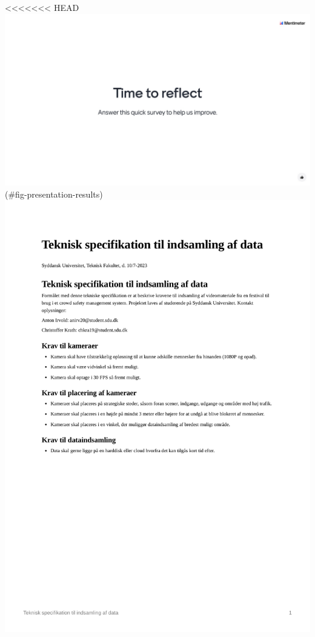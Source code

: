 \documentclass[
]{article}
\begin{document}
\textless\textless\textless\textless\textless\textless\textless{} HEAD
\includegraphics{../appendices/MentimeterPresentation.pdf}(\#fig-presentation-results)
\includegraphics[width=1\textwidth,height=1\textheight]{../appendices/teknisk-specifikation.png}
\end{document}
